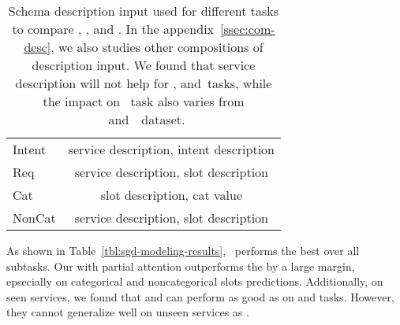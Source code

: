 \begin{table}[!t]
\begin{center}{\small
\setlength{\tabcolsep}{3pt}
\begin{tabular}{l|c}
  \toprule
\hline
Intent & service description, intent description \\
Req    & service description, slot description   \\
Cat    & slot description, cat value             \\
NonCat & service description, slot description   \\
\hline
  \bottomrule
\end{tabular}}
\end{center}
\caption{\label{tbl:schema-seq} Schema description input used for
  different tasks to compare \DE, \CE, and \FE. In the
  appendix~\ref{ssec:com-desc}, we also studies other compositions of
description input. We found that service description will not help for
\IC, \RSI and~\CSL tasks, while the impact on \NSL~task also varies
from \sgdst~and~\multiwoz~dataset.}
\end{table}


 As shown in Table~\ref{tbl:sgd-modeling-results},
\CE~performs the best over all subtasks. Our \FE with partial
attention outperforms the \DE by a large margin, epsecially on
categorical and noncategorical slots predictions. Additionally, on
seen services, we found that \DE and \FE can perform as good as \CE on
\IC and \RSI tasks. However, they cannot generalize well on unseen
services as \CE. %

